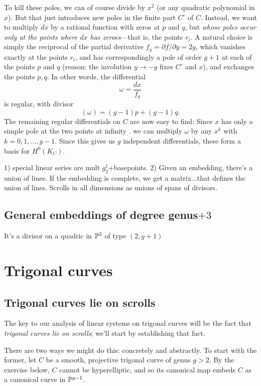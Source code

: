 To kill these poles, we can of course divide by $x^2$ (or any quadratic polynomial in $x$). But that just introduces new poles in the finite part $C^\circ$ of $C$. Instead, we want to multiply $dx$ by a rational function with zeros at $p$ and $q$, but \emph{whose poles occur only at the points where $dx$ has zeroes}---that is, the points $r_i$.  A natural choice is simply the reciprocal of the partial derivative $f_y = \partial f/ \partial y = 2y$, which vanishes exactly at the points $r_i$, and has correspondingly a pole of order $g+1$ at each of the points $p$ and $q$ (reason: the involution $y\to -y$ fixes $C^\circ$ and $x$), and exchanges the points $p,q$. In other words, the differential
$$
\omega = \frac{dx}{f_y}
$$
is regular, with divisor
$$
(\omega) = (g-1)p + (g-1)q.
$$
The remaining regular differentials on $C$ are now easy to find: Since $x$ has only a simple pole
at the two points at infinity . we can  multiply $\omega$ by any $x^k$ with $k = 0, 1, \dots, g-1$. Since this gives us $g$ independent differentials, these  form a basis for $H^0(K_C)$.


 1) special linear series are mult $g^1_2$+basepoints. 2) Given an embedding, there's a union of lines. If the embedding is complete, we get a matrix...that defines the union of lines. Scrolls in all dimensions as unions of spans of divisors.
 
 
\subsection{General embeddings of degree
genus$+3$} 

It's a divisor on a quadric in $\PP^{3}$ of type $(2,g+1)$


\section{Trigonal curves}

\subsection{Trigonal curves lie on scrolls}

The key to our analysis of linear systems on trigonal curves will be the fact that \emph{trigonal curves lie on scrolls}; we'll start by establishing that fact.

There are two ways we might do this: concretely and abstractly. To start with the former, let $C$ be a smooth, projective trigonal curve of genus $g > 2$. By the exercise below, $C$ cannot be hyperelliptic, and so its canonical map embeds $C$ as a canonical curve in $\PP^{g-1}$.

